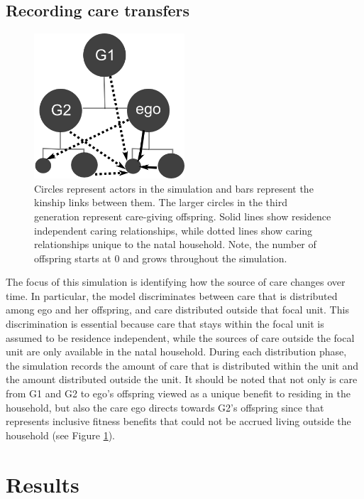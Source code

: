 \subsection{Recording care transfers}
\label{sec:1c}

\begin{figure}[!ht]
  \includegraphics[width=0.5\textwidth]{Fig1.png}
\caption{Circles represent actors in the simulation and bars represent the kinship links between them.  The larger circles in the third generation represent care-giving offspring.  Solid lines show residence independent caring relationships, while dotted lines show caring relationships unique to the natal household.  Note, the number of offspring starts at 0 and grows throughout the simulation.}
\label{fig:kin_diag}       %
\end{figure}

The focus of this simulation is identifying how the source of care changes over time.  In particular, the model discriminates between care that is distributed among ego and her offspring, and care distributed outside that focal unit.  This discrimination is essential because care that stays within the focal unit is assumed to be residence independent, while the sources of care outside the focal unit are only available in the natal household.  During each distribution phase, the simulation records the amount of care that is distributed within the unit and the amount distributed outside the unit.  It should be noted that not only is care from G1 and G2 to ego's offspring viewed as a unique benefit to residing in the household, but also the care ego directs towards G2's offspring since that represents inclusive fitness benefits that could not be accrued living outside the household (see Figure \ref{fig:kin_diag}).

\section{Results}
\label{sec:2}

